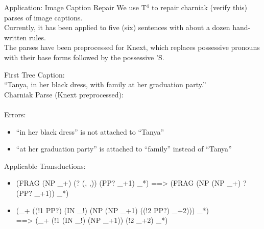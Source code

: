 \begin {frame}{Application: Image Caption Repair}
  We use T$^4$ to repair charniak (verify this) parses of image captions. \\
  Currently, it has been applied to five (six) sentences with about a dozen hand-written rules.\\
  The parses have been preprocessed for Knext, which replaces possessive pronouns with their base forms followed by the possessive 'S. 
\end {frame}

\begin{frame} {First Tree}
  Caption:\\
  ``Tanya, in her black dress, with family at her graduation party.''\\

  Charniak Parse (Knext preprocessed):\\
  \\

  Errors:\\
  \begin{itemize}
  \item   ``in her black dress'' is not attached to ``Tanya''
  \item   ``at her graduation party'' is attached to ``family'' instead of ``Tanya''
  \end{itemize}

  Applicable Transductions:\\
  \begin{itemize}
  \item {\ttfamily \tiny (FRAG (NP \_+) (? (, ,)) (PP? \_+1) \_*) ==> (FRAG (NP (NP \_+) ? (PP? \_+1)) \_*)} 
  \item {\ttfamily \tiny (\_+ ((!1 PP?) (IN \_!) (NP (NP \_+1) ((!2 PP?) \_+2))) \_*)\\ ==> (\_+ (!1 (IN \_!) (NP \_+1)) (!2 \_+2) \_*)}
  \end{itemize}
\end{frame}


